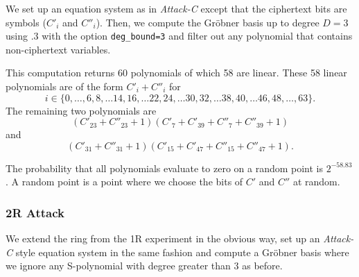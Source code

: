 We set up an equation system as in \emph{Attack-C} except that the ciphertext bits are symbols ($C'_{i}$ and $C''_{i}$). Then, we compute the Gröbner basis up to degree $D=3$ using .3 \cite{polybori} with the option \texttt{deg\_bound=3} and filter out any polynomial that contains non-ciphertext variables.

This computation returns 60 polynomials of which 58 are linear. These 58 linear polynomials are of the form $C'_{i} + C''_{i}$ for 
$$
i \in \{0,\dots,6, 8, \dots 14, 16, \dots 22, 24, \dots 30, 32, \dots 38, 40, \dots 46, 48, \dots, 63\}.
$$
The remaining two polynomials are $$(C'_{23} + C''_{23} + 1)(C'_{7} + C'_{39} + C''_{7} + C''_{39} + 1)$$ and 
$$(C'_{31} + C''_{31} + 1)(C'_{15} + C'_{47} + C''_{15} + C''_{47} + 1).$$

The probability that all polynomials evaluate to zero on a random point is $2^{-58.83}$. A random point is a point where we choose the bits of $C'$ and $C''$ at random.

\subsubsection*{2R Attack}

We extend the ring from the 1R experiment in the obvious way, set up an \emph{Attack-C} style equation system in the
same fashion and compute a Gröbner basis where we ignore any S-polynomial with degree greater than $3$ as before.

